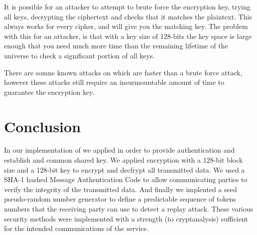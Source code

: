 \documentclass[a4paper,11pt]{article}
\begin{document}
It is possible for an attacker to attempt to brute force the encryption key, 
trying all keys, decrypting the ciphertext and checks that it matches the 
plaintext. This always works for every cipher, and will give you the matching 
key. The problem with this for an attacker, is that with a key size of 128-bits 
the key space is large enough that you need much more time than the remaining 
lifetime of the universe to check a significant portion of all keys.

There are somne known attacks on  which are faster than a brute
force attack, however these attacks still require an insurmountable amount of 
time to guarantee the encryption key.

\section{Conclusion}
In our implementation of \packageName{} we applied  in order to provide authentication and establish and common shared 
key. We applied  encryption with a 128-bit block size and a
128-bit key to encrypt and decfrypt all transmitted data. We used a SHA-1 
hashed Message Authentication Code to allow communicating parties to verify the
integrity of the transmitted data. And finally we implented a seed pseudo-random
number generator to define a predictable sequence of tokens numbers that the 
receiving party can use to detect a replay attack. These various security 
methods were implemented with a strength (to cryptanalysis) sufficient for the 
intended communications of the \serviceName{} service.
\end{document}
